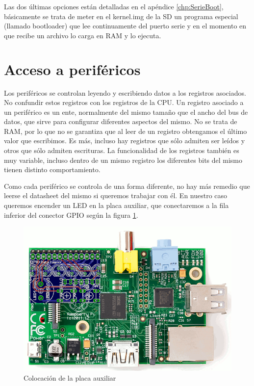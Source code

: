 Las dos últimas opciones están detalladas en el apéndice \ref{chp:SerieBoot},
básicamente se trata de meter en el kernel.img de la SD un programa especial (llamado
bootloader) que lee continuamente del puerto serie y en el momento en que recibe
un archivo lo carga en RAM y lo ejecuta.

\section{Acceso a periféricos}

Los periféricos se controlan leyendo y escribiendo datos a los registros asociados. No
confundir estos registros con los registros de la CPU. Un registro asociado a un periférico
es un ente, normalmente del mismo tamaño que el ancho del bus de datos, que sirve para
configurar diferentes aspectos del mismo. No se trata de RAM, por lo que no se garantiza que
al leer de un registro obtengamos el último valor que escribimos. Es más, incluso hay
registros que sólo admiten ser leídos y otros que sólo admiten escrituras. La funcionalidad
de los registros también es muy variable, incluso dentro de un mismo registro los diferentes
bits del mismo tienen distinto comportamiento.

Como cada periférico se controla de una forma diferente, no hay más remedio que leerse
el datasheet del mismo si queremos trabajar con él. En nuestro caso queremos encender un LED
en la placa auxiliar, que conectaremos a la fila inferior del conector GPIO según la
figura \ref{fig:posicionaux}.

\begin{figure}[h]
  \centering
    \includegraphics[width=14cm]{graphs/posicionaux.png}
  \caption{Colocación de la placa auxiliar}
  \label{fig:posicionaux}
\end{figure}


